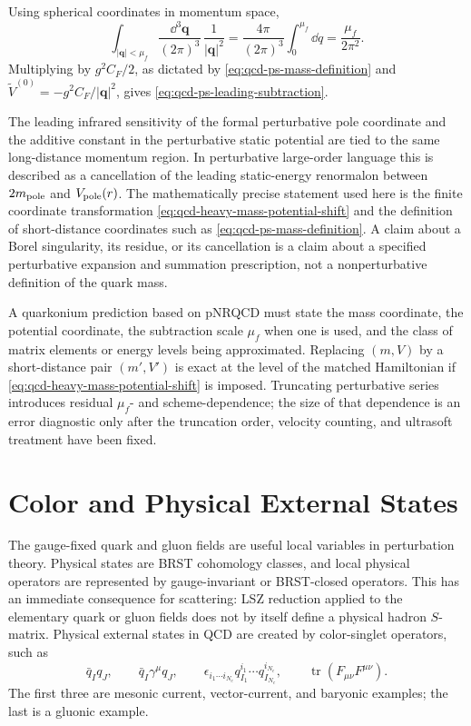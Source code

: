 Using spherical coordinates in momentum space,
\[
  \int_{|\mathbf q|<\mu_f}
  \frac{\dd^3\mathbf q}{(2\pi)^3}\,\frac1{|\mathbf q|^2}
  =
  \frac{4\pi}{(2\pi)^3}\int_0^{\mu_f}\dd q
  =
  \frac{\mu_f}{2\pi^2}.
\]
Multiplying by \(g^2C_F/2\), as dictated by
\eqref{eq:qcd-ps-mass-definition} and
\(\widetilde V^{(0)}=-g^2C_F/|\mathbf q|^2\), gives
\eqref{eq:qcd-ps-leading-subtraction}.

\begin{remark}
\label{rem:qcd-heavy-renormalon-status}
The leading infrared sensitivity of the formal perturbative pole coordinate
and the additive constant in the perturbative static potential are tied to the
same long-distance momentum region.  In perturbative large-order language this
is described as a cancellation of the leading static-energy renormalon between
\(2m_{\rm pole}\) and \(V_{\rm pole}(r)\).  The mathematically precise
statement used here is the finite coordinate transformation
\eqref{eq:qcd-heavy-mass-potential-shift} and the definition of
short-distance coordinates such as \eqref{eq:qcd-ps-mass-definition}.  A claim
about a Borel singularity, its residue, or its cancellation is a claim about a
specified perturbative expansion and summation prescription, not a
nonperturbative definition of the quark mass.
\end{remark}

\begin{controlledapproximation}
\label{ca:qcd-heavy-mass-scheme-control}
A quarkonium prediction based on pNRQCD must state the mass coordinate, the
potential coordinate, the subtraction scale \(\mu_f\) when one is used, and the
class of matrix elements or energy levels being approximated.  Replacing
\((m,V)\) by a short-distance pair \((m',V')\) is exact at the level of the
matched Hamiltonian if \eqref{eq:qcd-heavy-mass-potential-shift} is imposed.
Truncating perturbative series introduces residual \(\mu_f\)- and
scheme-dependence; the size of that dependence is an error diagnostic only
after the truncation order, velocity counting, and ultrasoft treatment have
been fixed.
\end{controlledapproximation}

\section{Color and Physical External States}

The gauge-fixed quark and gluon fields are useful local variables in
perturbation theory.  Physical states are BRST cohomology classes, and local
physical operators are represented by gauge-invariant or BRST-closed
operators.  This has an immediate consequence for scattering: LSZ reduction
applied to the elementary quark or gluon fields does not by itself define a
physical hadron \(S\)-matrix.  Physical external states in QCD are created by
color-singlet operators, such as
\[
  \bar q_I q_J,\qquad
  \bar q_I\gamma^\mu q_J,\qquad
  \epsilon_{i_1\cdots i_{N_c}}
  q^{i_1}_{I_1}\cdots q^{i_{N_c}}_{I_{N_c}},
  \qquad
  \operatorname{tr}(F_{\mu\nu}F^{\mu\nu}).
\]
The first three are mesonic current, vector-current, and baryonic examples;
the last is a gluonic example.

